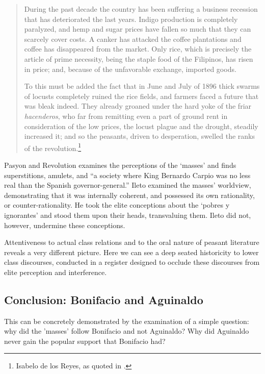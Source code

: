 \begin{quote}
During the past decade the country has been suffering a business recession that has deteriorated the last years. Indigo production is completely paralyzed, and hemp and sugar prices have fallen so much that they can scarcely cover costs. A canker has attacked the coffee plantations and coffee has disappeared from the market. Only rice, which is precisely the article of prime necessity, being the staple food of the Filipinos, has risen in price; and, because of the unfavorable exchange, imported goods.

To this must be added the fact that in June and July of 1896 thick swarms of locusts completely ruined the rice fields, and farmers faced a future that was bleak indeed. They already groaned under the hard yoke of the friar \textit{hacenderos}, who far from remitting even a part of ground rent in consideration of the low prices, the locust plague and the drought, steadily increased it; and so the peasants, driven to desperation, swelled the ranks of the revolution.\footnote{Isabelo de los Reyes, as quoted in \cite[205]{DelaCosta1965}.}
\end{quote}

Pasyon and Revolution examines the perceptions of the \enquote*{masses} and finds superstitions, amulets, and \enquote{a society where King Bernardo Carpio was no less real than the Spanish governor-general.} Ileto examined the masses' worldview, demonstrating that it was internally coherent, and possessed its own rationality, or counter-rationality. He took the elite conceptions about the \enquote*{pobres y ignorantes} and stood them upon their heads, transvaluing them. Ileto did not, however, undermine these conceptions.

Attentiveness to actual class relations and to the oral nature of peasant literature reveals a very different picture. Here we can see a deep seated historicity to lower class discourses, conducted in a register designed to occlude these discourses from elite perception and interference.

\subsection{Conclusion: Bonifacio and Aguinaldo}

This can be concretely demonstrated by the examination of a simple question: why did the 'masses' follow Bonifacio and not Aguinaldo? Why did Aguinaldo never gain the popular support that Bonifacio had?

